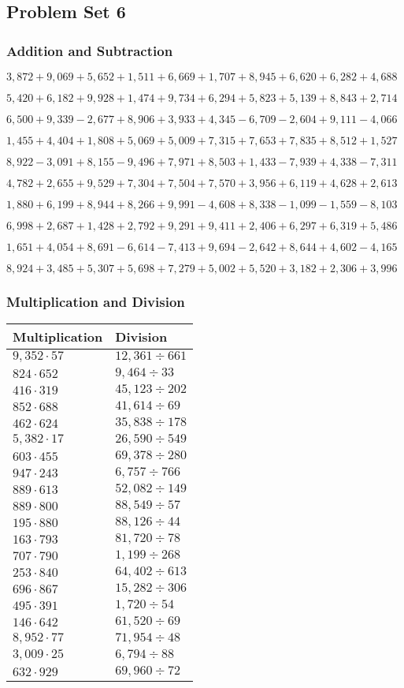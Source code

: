 \hypertarget{problem-set-6-3}{%
\subsection{Problem Set 6}\label{problem-set-6-3}}

\hypertarget{addition-and-subtraction-168}{%
\subsubsection{Addition and
Subtraction}\label{addition-and-subtraction-168}}

\(3,872+9,069+5,652+1,511+6,669+1,707+8,945+6,620+6,282+ 4,688\)

\(5,420+6,182+9,928+1,474+9,734+6,294+5,823+5,139+8,843+2,714\)

\(6,500+9,339-2,677+8,906+3,933+4,345-6,709-2,604+9,111-4,066\)

\(1,455+4,404+1,808+5,069+5,009+7,315+7,653+7,835+8,512+1,527\)

\(8,922-3,091+8,155-9,496+7,971+8,503+1,433-7,939+4,338-7,311\)

\(4,782+2,655+9,529+7,304+7,504+7,570+3,956+6,119+4,628+2,613\)

\(1,880+6,199+8,944+8,266+9,991-4,608+8,338-1,099-1,559-8,103\)

\(6,998+2,687+1,428+2,792+9,291+9,411+2,406+6,297+6,319+5,486\)

\(1,651+4,054+8,691-6,614-7,413+9,694-2,642+8,644+4,602-4,165\)

\(8,924+3,485+5,307+5,698+7,279+5,002+5,520+3,182+2,306+3,996\)

\hypertarget{multiplication-and-division-167}{%
\subsubsection{Multiplication and
Division}\label{multiplication-and-division-167}}

\begin{longtable}[]{@{}ll@{}}
\toprule
Multiplication & Division\tabularnewline
\midrule
\endhead
\(9,352\cdot57\) & \(12,361÷661\)\tabularnewline
\(824\cdot652\) & \(9,464÷33\)\tabularnewline
\(416\cdot319\) & \(45,123÷202\)\tabularnewline
\(852\cdot688\) & \(41,614÷69\)\tabularnewline
\(462\cdot624\) & \(35,838÷178\)\tabularnewline
\(5,382\cdot17\) & \(26,590÷549\)\tabularnewline
\(603\cdot455\) & \(69,378÷280\)\tabularnewline
\(947\cdot243\) & \(6,757÷766\)\tabularnewline
\(889\cdot613\) & \(52,082÷149\)\tabularnewline
\(889\cdot800\) & \(88,549÷57\)\tabularnewline
\(195\cdot880\) & \(88,126÷44\)\tabularnewline
\(163\cdot793\) & \(81,720÷78\)\tabularnewline
\(707\cdot790\) & \(1,199÷268\)\tabularnewline
\(253\cdot840\) & \(64,402÷613\)\tabularnewline
\(696\cdot867\) & \(15,282÷306\)\tabularnewline
\(495\cdot391\) & \(1,720÷54\)\tabularnewline
\(146\cdot642\) & \(61,520÷69\)\tabularnewline
\(8,952\cdot77\) & \(71,954÷48\)\tabularnewline
\(3,009\cdot25\) & \(6,794÷88\)\tabularnewline
\(632\cdot929\) & \(69,960÷72\)\tabularnewline
\bottomrule
\end{longtable}

